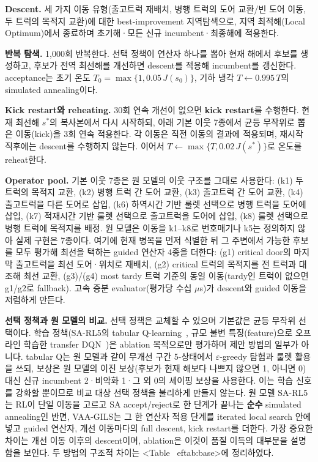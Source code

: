 \documentclass[10pt,a4paper]{article}
\begin{document}
\textbf{Descent.} 세 가지 이동 유형(출고트럭 재배치, 병행 트럭의 도어 교환/빈 도어 이동, 두
트럭의 목적지 교환)에 대한 best-improvement 지역탐색으로, 지역 최적해(Local Optimum)에서
종료하며 초기해·모든 신규 incumbent·최종해에 적용한다.

\textbf{반복 탐색.} 1{,}000회 반복한다. 선택 정책이 연산자 하나를 뽑아
현재 해에서 후보를 생성하고, 후보가 전역 최선해를 개선하면 descent를 적용해
incumbent를 갱신한다. acceptance는 초기 온도 $T_0=\max\{1,0.05\,J(s_0)\}$, 기하
냉각 $T\leftarrow0.995\,T$의 simulated annealing이다.

\textbf{Kick restart와 reheating.} 30회 연속 개선이 없으면 \textbf{kick restart}를
수행한다. 현재 최선해 $s^*$의 복사본에서 다시 시작하되, 아래 기본 이웃 7종에서
균등 무작위로 뽑은 이동(kick)을 3회 연속 적용한다. 각 이동은 직전 이동의 결과에
적용되며, 재시작 직후에는 descent를 수행하지 않는다. 이어서
$T\leftarrow\max\{T,0.02\,J(s^*)\}$로 온도를 reheat한다.

\textbf{Operator pool.} 기본 이웃 7종은 원 모델의 이웃 구조를 그대로 사용한다:
(k1) 두 트럭의 목적지 교환, (k2) 병행 트럭 간 도어 교환, (k3) 출고트럭 간 도어
교환, (k4) 출고트럭을 다른 도어로 삽입, (k6) 하역시간 기반 룰렛 선택으로 병행 트럭을 도어에 삽입, (k7) 적재시간 기반 룰렛 선택으로 출고트럭을 도어에 삽입,
(k8) 룰렛 선택으로 병행 트럭에 목적지를 배정. 원 모델은 이동을 k1--k8로
번호매기나 k5는 정의하지 않아 실제 구현은 7종이다. 여기에 현재 병목을 먼저 식별한 뒤 그
주변에서 가능한 후보를 모두 평가해 최선을 택하는 guided 연산자 4종을 더한다: (g1) critical door의 마지막
출고트럭을 최선 도어·위치로 재배치, (g2) critical 트럭의 목적지를 전 트럭과
대조해 최선 교환, (g3)/(g4) most tardy 트럭 기준의 동일 이동(tardy인 트럭이 없으면
g1/g2로 fallback). 고속 증분 evaluator(평가당 수십 $\mu$s)가 descent와 guided 이동을
저렴하게 만든다.

\textbf{선택 정책과 원 모델의 비교.} 선택 정책은 교체할 수 있으며 기본값은
균등 무작위 선택이다. 학습 정책(SA-RL5의 tabular
Q-learning~\cite{watkins1992}, 규모 불변 특징(feature)으로 오프라인 학습한 transfer
DQN~\cite{mnih2015})은 ablation 목적으로만 평가하며 제안 방법의 일부가 아니다.
tabular Q는 원 모델과 같이 무개선 구간 5-상태에서 $\varepsilon$-greedy 탐험과 룰렛
활용을 쓰되, 보상은 원 모델의 이진 보상(후보가 현재 해보다 나쁘지 않으면 1, 아니면 0)
대신 신규 incumbent 2·비악화 1·그 외 0의 셰이핑 보상을 사용한다. 이는 학습 신호를
강화할 뿐이므로 비교 대상 선택 정책을 불리하게 만들지 않는다. 원 모델 SA-RL5는 RL이 단일 이동을 고르고 SA accept/reject로 한 단계가 끝나는
\textbf{순수} simulated annealing인 반면, VAA-GILS는 그 한 연산자 적용 단계를 iterated
local search 안에 넣고 guided 연산자, 개선 이동마다의 full descent, kick
restart를 더한다. 가장 중요한 차이는 개선 이동 이후의 descent이며, ablation은
이것이 품질 이득의 대부분을 설명함을 보인다. 두 방법의 구조적 차이는
<Table~
ef{tab:base}>에 정리하였다.
\end{document}
